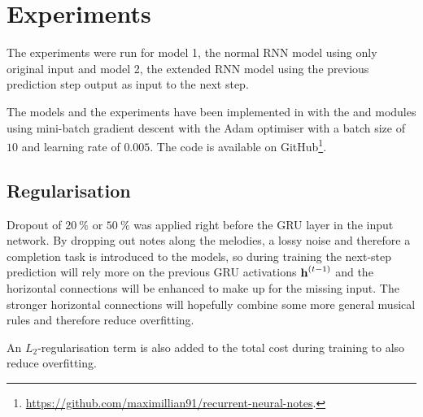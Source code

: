 \section{Experiments}
\label{sec:experiments}


The experiments were run for model 1, the normal RNN model using only original input and model 2, the extended RNN model using the previous prediction step output as input to the next step.

The models and the experiments have been implemented in \Python with the \Theano and \Lasagne modules using mini-batch gradient descent with the Adam optimiser \cite{Kingma2014c} with a batch size of $10$ and learning rate of $0.005$.
The code is available on GitHub\footnote{\url{https://github.com/maximillian91/recurrent-neural-notes}.}.

\subsection{Regularisation} %
\label{sub:regularization}

Dropout of $\SI{20}{\%}$ or $\SI{50}{\%}$ was applied right before the GRU layer in the input network. By dropping out notes along the melodies, a lossy noise and therefore a completion task is introduced to the models, so during training the next-step prediction will rely more on the previous GRU activations $\bm{\mathrm{h}}^{(t-1)}$ and the horizontal connections will be enhanced to make up for the missing input. The stronger horizontal connections will hopefully combine some more general musical rules and therefore reduce overfitting. 

An $L_2$-regularisation term is also added to the total cost during training to also reduce overfitting.



